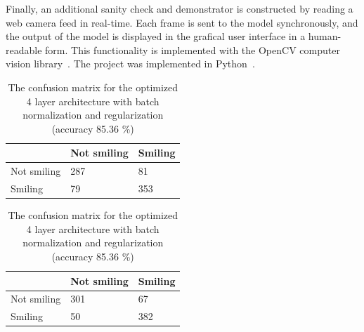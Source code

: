 \documentclass{article}
\begin{document}
Finally, an additional sanity check and demonstrator is constructed by
reading a web camera feed in real-time. Each frame is sent to the
model synchronously, and the output of the model is displayed in the
grafical user interface in a human-readable form. This functionality
is implemented with the OpenCV computer vision library~\cite{opencv}.
The project was implemented in Python~\cite{rossum_1995}.

\begin{table}[t]
  \begin{minipage}[t]{0.5\textwidth}\centering
    \centering
    \caption{The confusion matrix for the optimized default architecture
      with batch normalization (accuracy 80.00 \%)}\label{tab:default-confusion}
    \begin{tabular}{lll}
      \hline
      & Not smiling & Smiling \\ \hline
      \multicolumn{1}{l|}{Not smiling} & 287         & 81      \\
      \multicolumn{1}{l|}{Smiling}     & 79          & 353     \\ \hline
    \end{tabular}
  \end{minipage}
  \begin{minipage}[t]{0.5\textwidth}\centering
    \centering
    \caption{The confusion matrix for the optimized 4 layer architecture
      with batch normalization and regularization (accuracy 85.36
      \%)}\label{tab:best-confusion}
    \begin{tabular}{lll}
      \hline
      & Not smiling & Smiling \\ \hline
      \multicolumn{1}{l|}{Not smiling} & 301         & 67     \\
      \multicolumn{1}{l|}{Smiling}     & 50          & 382     \\ \hline
    \end{tabular}
  \end{minipage}
\end{table}
\end{document}
